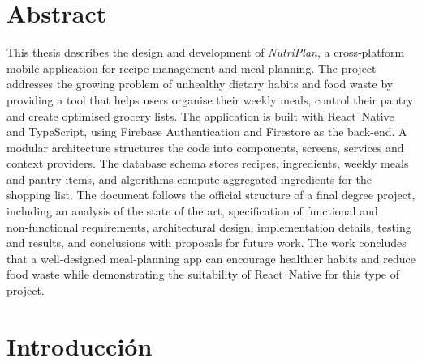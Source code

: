 \documentclass[twoside, openright, 11pt]{report}
\begin{document}
\chapter*{Abstract}
\thispagestyle{empty}

This thesis describes the design and development of \emph{NutriPlan}, a cross‑platform mobile application for recipe management and meal planning. The project addresses the growing problem of unhealthy dietary habits and food waste by providing a tool that helps users organise their weekly meals, control their pantry and create optimised grocery lists. The application is built with React Native and TypeScript, using Firebase Authentication and Firestore as the back‑end. A modular architecture structures the code into components, screens, services and context providers. The database schema stores recipes, ingredients, weekly meals and pantry items, and algorithms compute aggregated ingredients for the shopping list. The document follows the official structure of a final degree project, including an analysis of the state of the art, specification of functional and non‑functional requirements, architectural design, implementation details, testing and results, and conclusions with proposals for future work. The work concludes that a well‑designed meal‑planning app can encourage healthier habits and reduce food waste while demonstrating the suitability of React Native for this type of project.

\tableofcontents
\cleardoublepage
{}
\listoffigures
\cleardoublepage
{}
\listoftables

\chapter{Introducción}
\label{cap.introduccion}
\end{document}
